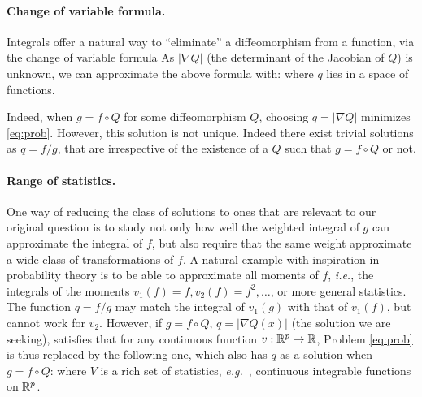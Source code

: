 \paragraph{Change of variable formula.} Integrals offer a natural way to ``eliminate'' a diffeomorphism from a function, via the change of variable formula
As $|\nabla Q|$ (the determinant of the Jacobian of $Q$) is unknown, we can approximate the above formula with:
 where $q$ lies in a space of functions.

Indeed, when $g = f\circ Q$ for some diffeomorphism $Q$, choosing $q = \vert\nabla Q\vert$ minimizes \eqref{eq:prob}. However, this solution is not unique. Indeed there exist trivial solutions as $q = f / g$, that are irrespective of the existence of a $Q$ such that $g=f\circ Q$ or not.

\paragraph{Range of statistics.} One way of reducing the class of solutions to ones that are relevant to our original question is to study not only how well the weighted integral of $g$ can approximate the integral of $f$, but also require that the same weight approximate a wide class of transformations of $f$. A natural example with inspiration in probability theory is to be able to approximate all moments of $f$, \emph{i.e.}, the integrals of the moments $v_1(f) = f, v_2(f) = f^2, \dots$, or more general statistics. The function $q = f / g$ may match the integral of $v_1(g)$ with that of $v_1(f)$, but cannot work for $v_2$. However, if $g = f\circ Q$, $q = |\nabla Q(x)|$ (the solution we are seeking), satisfies that for any continuous function $v: \mathbb R^p \to \mathbb R$,
Problem \eqref{eq:prob} is thus replaced by the following one, which also has $q$ as a solution when $g = f \circ Q$:
 where $V$ is a rich set of statistics, \emph{e.g.\ }, continuous integrable functions on $\mathbb R^p$.



